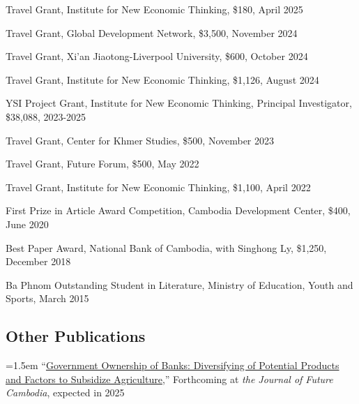 \documentclass[10pt,a4paper]{article}
\begin{document}
	Travel Grant, Institute for New Economic Thinking, \$180, April 2025
	
	Travel Grant, Global Development Network, \$3,500, November 2024
	
	Travel Grant, Xi'an Jiaotong-Liverpool University, \$600, October 2024
	
	Travel Grant, Institute for New Economic Thinking, \$1,126, August 2024
	
	YSI Project Grant, Institute for New Economic Thinking, Principal Investigator, \$38,088, 2023-2025
	
	Travel Grant, Center for Khmer Studies, \$500, November 2023
	
	Travel Grant, Future Forum, \$500, May 2022
	
	Travel Grant, Institute for New Economic Thinking, \$1,100, April 2022
	
	First Prize in Article Award Competition, Cambodia Development Center, \$400, June 2020
	
	Best Paper Award, National Bank of Cambodia, with Singhong Ly, \$1,250, December 2018 
	
	Ba Phnom Outstanding Student in Literature, Ministry of Education, Youth and Sports, March 2015
	




\subsection*{Other Publications}

	\hangindent=1.5em
	“\href{https://kosalnith.github.io/research/papers/GOB.pdf}{Government Ownership of Banks: Diversifying of Potential Products and Factors to Subsidize Agriculture},” Forthcoming at \textit{the Journal of Future Cambodia}, expected in 2025 \\ \vspace{-.5em} 
	
\end{document}
